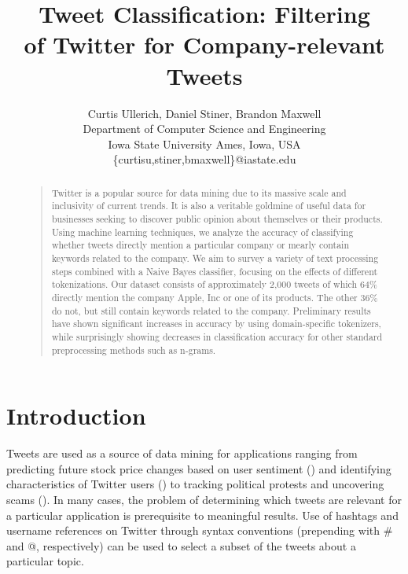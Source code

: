 \documentclass[letterpaper]{article}
\begin{document}
\title{Tweet Classification: Filtering \\ of Twitter for Company-relevant Tweets}
\author{
Curtis Ullerich, Daniel Stiner, Brandon Maxwell\\
Department of Computer Science and Engineering\\
Iowa State University
Ames, Iowa, USA\\
\{curtisu,stiner,bmaxwell\}@iastate.edu\\
}
\maketitle
\begin{abstract}
\begin{quote}
Twitter is a popular source for data mining due to its massive scale and inclusivity of current trends.
It is also a veritable goldmine of useful data for businesses seeking to discover public opinion about themselves or their products.
Using machine learning techniques, we analyze the accuracy of classifying whether tweets directly mention a particular company or mearly contain keywords related to the company.
We aim to survey a variety of text processing steps combined with a Naive Bayes classifier, focusing on the effects of different tokenizations.
Our dataset consists of approximately 2,000 tweets of which 64\% directly mention the company Apple, Inc or one of its products. The other 36\% do not, but still contain keywords related to the company.
Preliminary results have shown significant increases in accuracy %
by using domain-specific tokenizers, while surprisingly showing decreases in classification accuracy for other standard preprocessing methods such as n-grams.%
\end{quote}
\end{abstract}

\section{Introduction}
Tweets are used as a source of data mining for applications ranging from predicting future stock price changes based on user sentiment (\citeauthor{Ruiz}) and identifying characteristics of Twitter users (\citeauthor{conf/icwsm/PennacchiottiP11}) to tracking political protests and uncovering scams (\citeauthor{ICWSM101540}).
In many cases, the problem of determining which tweets are relevant for a particular application is prerequisite to meaningful results. Use of hashtags and username references on Twitter through syntax conventions (prepending with \# and @, respectively) can be used to select a subset of the tweets about a particular topic. 
\end{document}
